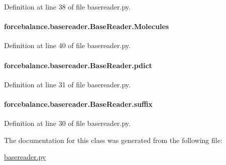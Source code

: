 Definition at line 38 of file basereader.\-py.

\hypertarget{classforcebalance_1_1basereader_1_1BaseReader_ad2842550aa690f1cd82e41ec8d6fe541}{
\paragraph[{Molecules}]{\setlength{\rightskip}{0pt plus 5cm}forcebalance.\-basereader.\-Base\-Reader.\-Molecules}}\label{classforcebalance_1_1basereader_1_1BaseReader_ad2842550aa690f1cd82e41ec8d6fe541}


Definition at line 40 of file basereader.\-py.

\hypertarget{classforcebalance_1_1basereader_1_1BaseReader_a1ca75e7775c49f57796fb3ba816486e7}{
\paragraph[{pdict}]{\setlength{\rightskip}{0pt plus 5cm}forcebalance.\-basereader.\-Base\-Reader.\-pdict}}\label{classforcebalance_1_1basereader_1_1BaseReader_a1ca75e7775c49f57796fb3ba816486e7}


Definition at line 31 of file basereader.\-py.

\hypertarget{classforcebalance_1_1basereader_1_1BaseReader_ab2aba0f349b78cb3c1e11c35f56d6bdf}{
\paragraph[{suffix}]{\setlength{\rightskip}{0pt plus 5cm}forcebalance.\-basereader.\-Base\-Reader.\-suffix}}\label{classforcebalance_1_1basereader_1_1BaseReader_ab2aba0f349b78cb3c1e11c35f56d6bdf}


Definition at line 30 of file basereader.\-py.



The documentation for this class was generated from the following file\-:\begin{DoxyCompactItemize}
\item 
\hyperlink{basereader_8py}{basereader.\-py}\end{DoxyCompactItemize}
